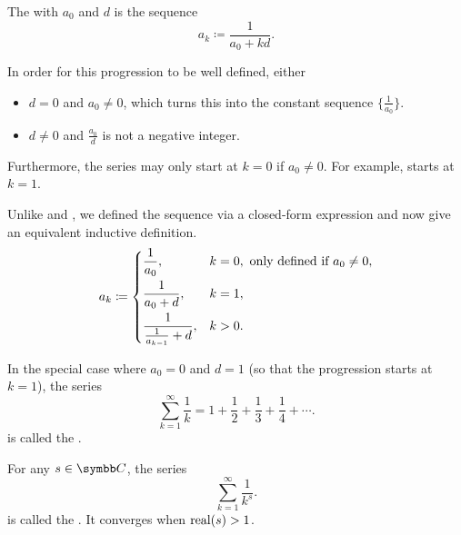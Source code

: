 \begin{Definition}\label{def:harmonic_progression}
  The  with  \( a_0 \) and  \( d \) is the sequence
  \begin{equation*}
    a_k \coloneqq \frac 1 {a_0 + kd}.
  \end{equation*}

  \begin{DefEnum}
     In order for this progression to be well defined, either
    \begin{itemize}
      \item \( d = 0 \) and \( a_0 \neq 0 \), which turns this into the constant sequence \( \{ \tfrac 1 {a_0} \} \).

      \item \( d \neq 0 \) and \( \frac {a_0} d \) is not a negative integer.
    \end{itemize}

    Furthermore, the series may only start at \( k = 0 \) if \( a_0 \neq 0 \). For example,  starts at \( k = 1 \).

     Unlike  and , we defined the sequence via a closed-form expression and now give an equivalent inductive definition. \begin{equation*}
      a_k \coloneqq \begin{dcases}
        \frac 1 {a_0}, &k = 0, \text{ only defined if } a_0 \neq 0, \\
        \frac 1 {a_0 + d}, &k = 1, \\
        \frac 1 {\frac 1 {a_{k-1}} + d}, &k > 0.
      \end{dcases}
    \end{equation*}

     In the special case where \( a_0 = 0 \) and \( d = 1 \) (so that the progression starts at \( k = 1 \)), the series
    \begin{equation}\label{def:harmonic_progression/harmonic_series}
      \sum_{k=1}^\infty \frac 1 k = 1 + \frac 1 2 + \frac 1 3 + \frac 1 4 + \cdots.
    \end{equation}
    is called the .

     For any \( s \in \BC \), the series
    \begin{equation*}
      \sum_{k=1}^\infty \frac 1 {k^s}.
    \end{equation*}
    is called the . It converges when \( \operatorname{real}(s) > 1 \).
  \end{DefEnum}
\end{Definition}
